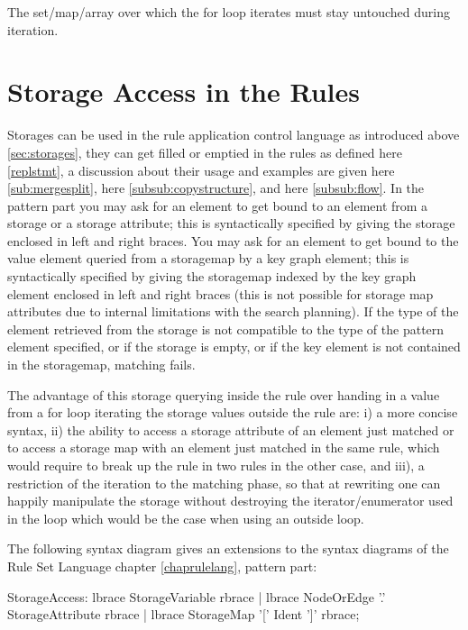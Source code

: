 \begin{warning}
The set/map/array over which the for loop iterates must stay untouched during iteration.
\end{warning}


\section{Storage Access in the Rules} \label{sub:storageaccess}

Storages can be used in the rule application control language as introduced above \ref{sec:storages}, they can get filled or emptied in the rules as defined here \ref{replstmt}, a discussion about their usage and examples are given here \ref{sub:mergesplit}, here \ref{subsub:copystructure}, and here \ref{subsub:flow}.
In the pattern part you may ask for an element to get bound to an element from a storage or a storage attribute;
this is syntactically specified by giving the storage enclosed in left and right braces.
You may ask for an element to get bound to the value element queried from a storagemap by a key graph element;
this is syntactically specified by giving the storagemap indexed by the key graph element enclosed in left and right braces
(this is not possible for storage map attributes due to internal limitations with the search planning).
If the type of the element retrieved from the storage is not compatible to the type of the pattern element specified,
or if the storage is empty, or if the key element is not contained in the storagemap, matching fails.

The advantage of this storage querying inside the rule over handing in a value from a for loop iterating the storage values outside the rule are: i) a more concise syntax, ii) the ability to access a storage attribute of an element just matched or to access a storage map with an element just matched in the same rule, which would require to break up the rule in two rules in the other case, and iii), a restriction of the iteration to the matching phase, so that at rewriting one can happily manipulate the storage without destroying the iterator/enumerator used in the loop which would be the case when using an outside loop.

The following syntax diagram gives an extensions to the syntax diagrams of the Rule Set Language chapter \ref{chaprulelang}, pattern part:
\begin{rail}
  StorageAccess:
    lbrace StorageVariable rbrace |
    lbrace NodeOrEdge '.' StorageAttribute rbrace |
    lbrace StorageMap '[' Ident ']' rbrace;
\end{rail}

